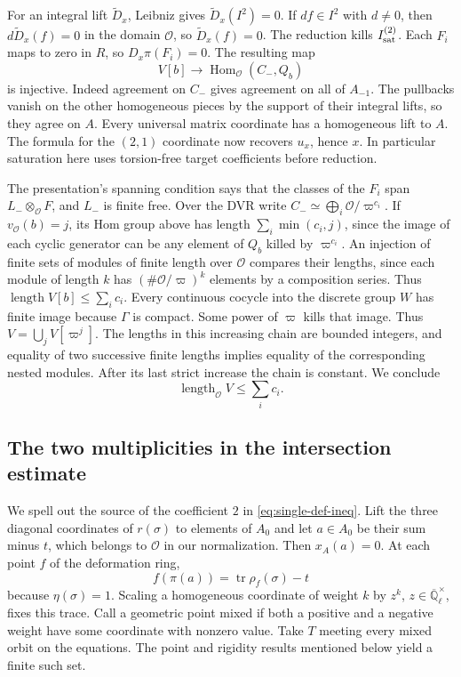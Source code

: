 For an integral lift \(\widetilde D_x\), Leibniz gives
\(\widetilde D_x(I^2)=0\). If \(df\in I^2\) with \(d\ne0\),
then \(d\widetilde D_x(f)=0\) in the domain \(\mathcal O\), so
\(\widetilde D_x(f)=0\). The reduction kills \(I^{(2)}_{\rm sat}\).
Each \(F_i\) maps to zero in \(R\), so \(D_x\pi(F_i)=0\).
The resulting map
\[
                 V[b]\longrightarrow
            \operatorname{Hom}_{\mathcal O}(C_-,Q_b)
\]
is injective. Indeed agreement on \(C_-\) gives agreement on all
of \(A_{-1}\). The pullbacks vanish on the other homogeneous pieces
by the support of their integral lifts, so they agree on \(A\).
Every universal matrix coordinate has a homogeneous lift to \(A\).
The formula for the \((2,1)\) coordinate now recovers \(u_x\), hence
\(x\). In particular saturation here uses torsion-free target
coefficients before reduction.

The presentation's spanning condition says that the classes of the
\(F_i\) span \(L_-\otimes_{\mathcal O}F\), and \(L_-\) is finite free.
Over the DVR write \(C_-\simeq\bigoplus_i\mathcal O/\varpi^{c_i}\).
If \(v_{\mathcal O}(b)=j\), its Hom group above has length
\(\sum_i\min(c_i,j)\), since the image of each cyclic generator can
be any element of \(Q_b\) killed by \(\varpi^{c_i}\).
An injection of finite sets of modules of finite length over
\(\mathcal O\) compares their lengths, since each module of length \(k\)
has \((\#\mathcal O/\varpi)^k\) elements by a composition series.
Thus \(\operatorname{length}V[b]\le\sum_i c_i\).
Every continuous cocycle into the discrete group \(W\) has finite
image because \(\Gamma\) is compact. Some power of \(\varpi\) kills
that image. Thus \(V=\bigcup_j V[\varpi^j]\). The lengths in this
increasing chain are bounded integers, and equality of two successive
finite lengths implies equality of the corresponding nested modules.
After its last strict increase the chain is constant. We conclude
\begin{equation}
                   \operatorname{length}_{\mathcal O} V
                        \le \sum_i c_i .
 \label{eq:single-cot-lower}
\end{equation}

\subsection{The two multiplicities in the intersection estimate}

We spell out the source of the coefficient \(2\) in
\eqref{eq:single-def-ineq}. Lift the three diagonal coordinates of
\(r(\sigma)\) to elements of \(A_0\) and let \(a\in A_0\) be their
sum minus \(t\), which belongs to \(\mathcal O\) in our normalization.
Then \(x_A(a)=0\). At each point \(f\) of the deformation ring,
\[
                 f(\pi(a))=\operatorname{tr}\rho_f(\sigma)-t
\]
because \(\eta(\sigma)=1\). Scaling a homogeneous coordinate of
weight \(k\) by \(z^k\), \(z\in\overline{\mathbb Q}_\ell^\times\),
fixes this trace. Call a geometric point mixed if both a positive
and a negative weight have some coordinate with nonzero value.
Take \(T\) meeting every mixed orbit on the equations. The
point and rigidity results mentioned below yield a finite such set.

